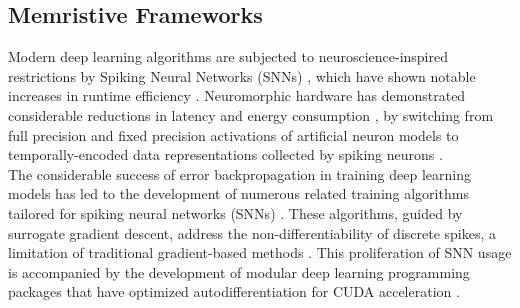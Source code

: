 \subsection[Memristive Frameworks]{Memristive Frameworks}


\noindent Modern deep learning algorithms are subjected to neuroscience-inspired restrictions by Spiking Neural Networks (SNNs) \cite{tavanaei2019deep}, which have shown notable increases in runtime efficiency \cite{wang2020supervised}. Neuromorphic hardware has demonstrated considerable reductions in latency and energy consumption \cite{wunderlich2019demonstrating}, by switching from full precision and fixed precision activations of artificial neuron models to temporally-encoded data representations collected by spiking neurons \cite{zhou2020towards}. \\


\noindent The considerable success of error backpropagation in training deep learning models has led to the development of numerous related training algorithms tailored for spiking neural networks (SNNs) \cite{werbos1990backpropagation}. These algorithms, guided by surrogate gradient descent, address the non-differentiability of discrete spikes, a limitation of traditional gradient-based methods \cite{neftci2019surrogate}. This proliferation of SNN usage is accompanied by the development of modular deep learning programming packages \cite{hazan2018bindsnet} that have optimized autodifferentiation for CUDA acceleration \cite{pehle2021norse}.\\

